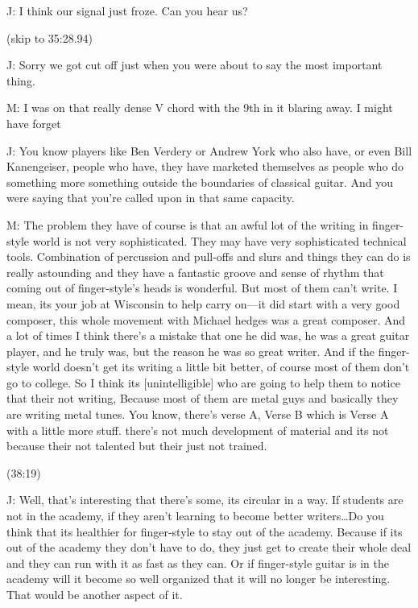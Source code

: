 \documentclass[11pt]{article}
\begin{document}
J: I think our signal just froze. Can you hear us?

(skip to 35:28.94)

J: Sorry we got cut off just when you were about to say the most important thing.

M: I was on that really dense V chord with the 9th in it blaring away. I might have forget

J: You know players like Ben Verdery or Andrew York who also have, or even Bill Kanengeiser, people who have, they have marketed themselves as people who do something more something outside the boundaries of classical guitar. And you were saying that you're called upon in that same capacity.

M: The problem they have of course is that an awful lot of the writing in finger-style world is not very sophisticated. They may have very sophisticated technical tools. Combination of percussion and pull-offs and slurs and things they can do is really astounding and they have a fantastic groove and sense of rhythm that coming out of finger-style's heads is wonderful. But most of them can't write. I mean, its your job at Wisconsin to help carry on—it did start with a very good composer, this whole movement with Michael hedges was a great composer. And a lot of times I think there's a mistake that one he did was, he was a great guitar player, and he truly was, but the reason he was so great writer. And if the finger-style world doesn't get its writing a little bit better, of course most of them don't go to college. So I think its [unintelligible] who are going to help them to notice that their not writing, Because most of them are metal guys and basically they are writing metal tunes. You know, there's verse A, Verse B which is Verse A with a little more stuff. there's not much development of material and its not because their not talented but their just not trained.

(38:19)

J: Well, that's interesting that there's some, its circular in a way. If students are not in the academy, if they aren't learning to become better writers\ldots{}Do you think that its healthier for finger-style to stay out of the academy. Because if its out of the academy they don't have to do, they just get to create their whole deal and they can run with it as fast as they can. Or if finger-style guitar is in the academy will it become so well organized that it will no longer be interesting. That would be another aspect of it.
\end{document}
